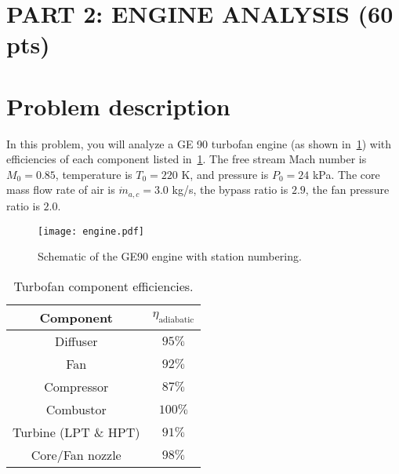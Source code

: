 \documentclass[11pt]{article}
\begin{document}
\section*{\textbf{PART 2:} ENGINE ANALYSIS (60 pts)} %
\label{sec:_textbf_part_2_engine_analysis}

\section*{Problem description} %
\label{sub:low_order_design_of_a_turbofan_engine}
\noindent In this problem, you will analyze a GE 90 turbofan engine (as shown in~\cref{fig:engine}) with efficiencies of each component listed in~\cref{tab:eff}. The free stream Mach number is $M_0 = 0.85$, temperature is $T_0 = 220$ K, and pressure is $P_0 = 24$ kPa. The core mass flow rate of air is $\dot{m}_{a,c} = 3.0$ kg/s, the bypass ratio is $2.9$, the fan pressure ratio is $2.0$.

\begin{figure}[!htb!]
	\centering
	\texttt{[image: engine.pdf]}
    \caption{Schematic of the GE90 engine with station numbering.}
	\label{fig:engine}
\end{figure}

\begin{table}[ht!]
	\caption{Turbofan component efficiencies.}
	\label{tab:eff}
	\centering
	\begin{tabular}{ | c | c |} 
			\hline
 		   	Component & $\eta_\text{adiabatic}$ \\\hline 
			\hline
			Diffuser & $95\%$ \\ 
			Fan & $92\%$ \\
			Compressor & $87\%$ \\
			Combustor & $100\%$ \\
			Turbine (LPT \& HPT) & $91\%$ \\
			Core/Fan nozzle & $98\%$ \\
			\hline
	\end{tabular}
\end{table}

\newpage
\end{document}
